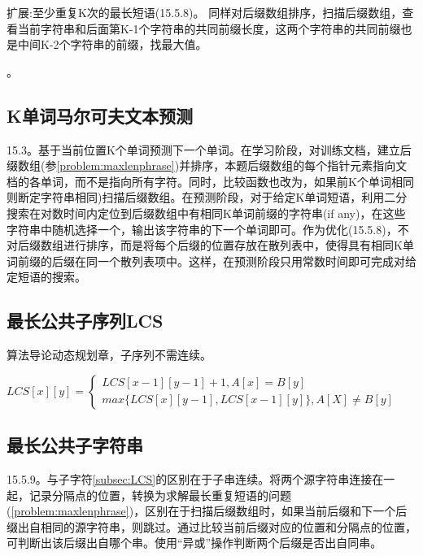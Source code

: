扩展:至少重复K次的最长短语(\cite{pp}15.5.8)。 同样对后缀数组排序，扫描后缀数组，查看当前字符串和后面第K-1个字符串的共同前缀长度，这两个字符串的共同前缀也是中间K-2个字符串的前缀，找最大值。

\label{problem:maxlenphrase}。

\subsection{K单词马尔可夫文本预测}
\cite{pp}15.3。基于当前位置K个单词预测下一个单词。在学习阶段，对训练文档，建立后缀数组(参\ref{problem:maxlenphrase})并排序，本题后缀数组的每个指针元素指向文档的各单词，而不是指向所有字符。同时，比较函数也改为，如果前K个单词相同则断定字符串相同)扫描后缀数组。在预测阶段，对于给定K单词短语，利用二分搜索在对数时间内定位到后缀数组中有相同K单词前缀的字符串(if any)，在这些字符串中随机选择一个，输出该字符串的下一个单词即可。作为优化(\cite{pp}15.5.8)，不对后缀数组进行排序，而是将每个后缀的位置存放在散列表中，使得具有相同K单词前缀的后缀在同一个散列表项中。这样，在预测阶段只用常数时间即可完成对给定短语的搜索。 


\subsection{最长公共子序列LCS}
算法导论动态规划章，子序列不需连续。

$LCS[x][y]= \left\{ \begin{array}{l} LCS[x-1][y-1]+1, A[x]=B[y] \\ max\{LCS[x][y-1], LCS[x-1][y]\}, A[X] \ne B[y] \end{array}  \right. $

\label{subsec:LCS}

\subsection{最长公共子字符串}
\cite{pp}15.5.9。与子字符\ref{subsec:LCS}的区别在于子串连续。将两个源字符串连接在一起，记录分隔点的位置，转换为求解最长重复短语的问题(\ref{problem:maxlenphrase})，区别在于扫描后缀数组时，如果当前后缀和下一个后缀出自相同的源字符串，则跳过。通过比较当前后缀对应的位置和分隔点的位置，可判断出该后缀出自哪个串。使用``异或''操作判断两个后缀是否出自同串。


